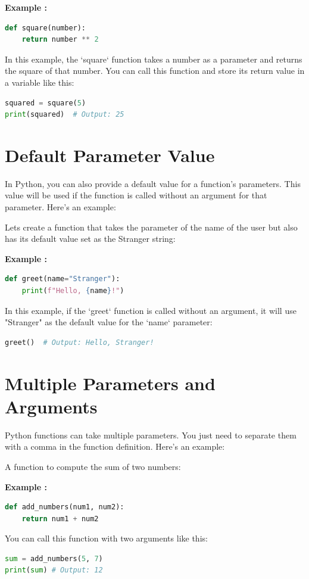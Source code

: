 \documentclass[12pt]{book}
\newtheorem{Example}{Example}[chapter]
\renewenvironment{Example}{\begin{trivlist}\item\relax
\textbf{Example \thesection: }}{\end{trivlist}}
\begin{document}
\begin{Example}
\begin{lstlisting}[language=Python]
def square(number):
    return number ** 2
\end{lstlisting}
In this example, the `square` function takes a number as a parameter and returns the square of that number. You can call this function and store its return value in a variable like this:
\begin{lstlisting}[language=Python]
squared = square(5)
print(squared)  # Output: 25
\end{lstlisting}
\end{Example}

\section{Default Parameter Value}
In Python, you can also provide a default value for a function's parameters. This value will be used if the function is called without an argument for that parameter. Here's an example:


Lets create a function that takes the parameter of the name of the user but also has its default value set as the Stranger string:
\begin{Example}
\begin{lstlisting}[language=Python]
def greet(name="Stranger"):
    print(f"Hello, {name}!")
\end{lstlisting}
In this example, if the `greet` function is called without an argument, it will use "Stranger" as the default value for the `name` parameter:
\begin{lstlisting}[language=Python]
greet()  # Output: Hello, Stranger!
\end{lstlisting}
\end{Example}

\section{Multiple Parameters and Arguments}
Python functions can take multiple parameters. You just need to separate them with a comma in the function definition. Here's an example:


A function to compute the sum of two numbers:
\begin{Example}
\begin{lstlisting}[language=Python]
def add_numbers(num1, num2):
	return num1 + num2
\end{lstlisting}
You can call this function with two arguments like this:
\begin{lstlisting}[language=Python]
sum = add_numbers(5, 7)
print(sum) # Output: 12
\end{lstlisting}
\end{Example}
\end{document}
